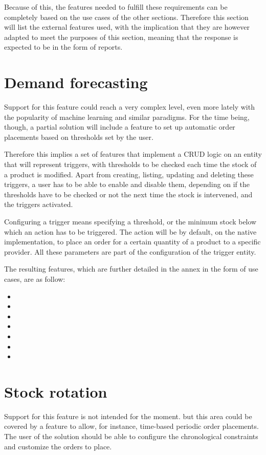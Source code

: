 Because of this, the features needed to fulfill these requirements can be completely based on the use cases of the other sections. Therefore this section will list the external features used, with the implication that they are however adapted to meet the purposes of this section, meaning that the response is expected to be in the form of reports.

\section{Demand forecasting}
Support for this feature could reach a very complex level, even more lately with the popularity of machine learning and similar paradigms. For the time being, though, a partial solution will include a feature to set up automatic order placements based on thresholds set by the user.

Therefore this implies a set of features that implement a CRUD logic on an entity that will represent triggers, with thresholds to be checked each time the stock of a product is modified. Apart from creating, listing, updating and deleting these triggers, a user has to be able to enable and disable them, depending on if the thresholds have to be checked or not the next time the stock is intervened, and the triggers activated.

Configuring a trigger means specifying a threshold, or the minimum stock below which an action has to be triggered. The action will be by default, on the native implementation, to place an order for a certain quantity of a product to a specific provider. All these parameters are part of the configuration of the trigger entity.

The resulting features, which are further detailed in the annex in the form of use cases, are as follow:

\begin{itemize}
\item {}
\item {}
\item {}
\item {}
\item {}
\item {}
\item {}
\end{itemize}

\section{Stock rotation}
Support for this feature is not intended for the moment. but this area could be covered by a feature to allow, for instance, time-based periodic order placements. The user of the solution should be able to configure the chronological constraints and customize the orders to place.

